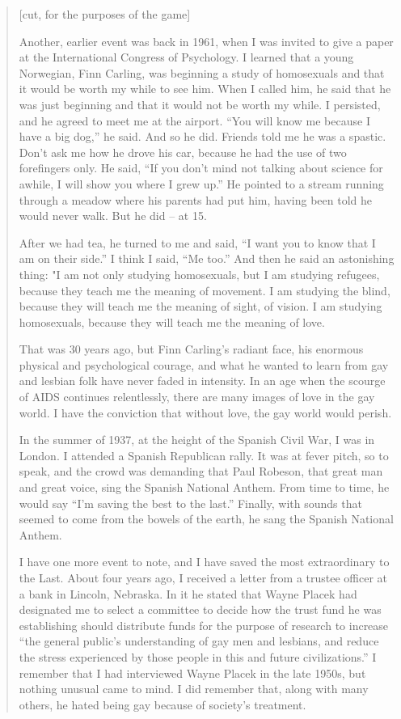 \begin{refsection}
\begin{quote}
[cut, for the purposes of the game]

Another, earlier event was back in 1961, when I was invited to give a paper at the International Congress of Psychology. I learned that a young Norwegian, Finn Carling, was beginning a study of homosexuals and that it would be worth my while to see him. When I called him, he said that he was just beginning and that it would not be worth my while. I persisted, and he agreed to meet me at the airport. ``You will know me because I have a big dog,'' he said. And so he did. Friends told me he was a spastic. Don't ask me how he drove his car, because he had the use of two forefingers only. He said, ``If you don't mind not talking about science for awhile, I will show you where I grew up.'' He pointed to a stream running through a meadow where his parents had put him, having been told he would never walk. But he did – at 15.

After we had tea, he turned to me and said, ``I want you to know that I am on their side.'' I think I said, ``Me too.'' And then he said an astonishing thing: "I am not only studying homosexuals, but I am studying refugees, because they teach me the meaning of movement. I am studying the blind, because they will teach me the meaning of sight, of vision. I am studying homosexuals, because they will teach me the meaning of love.

That was 30 years ago, but Finn Carling's radiant face, his enormous physical and psychological courage, and what he wanted to learn from gay and lesbian folk have never faded in intensity. In an age when the scourge of AIDS continues relentlessly, there are many images of love in the gay world. I have the conviction that without love, the gay world would perish.

In the summer of 1937, at the height of the Spanish Civil War, I was in London. I attended a Spanish Republican rally. It was at fever pitch, so to speak, and the crowd was demanding that Paul Robeson, that great man and great voice, sing the Spanish National Anthem. From time to time, he would say ``I'm saving the best to the last.'' Finally, with sounds that seemed to come from the bowels of the earth, he sang the Spanish National Anthem.

I have one more event to note, and I have saved the most extraordinary to the Last. About four years ago, I received a letter from a trustee officer at a bank in Lincoln, Nebraska. In it he stated that Wayne Placek had designated me to select a committee to decide how the trust fund he was establishing should distribute funds for the purpose of research to increase ``the general public's understanding of gay men and lesbians, and reduce the stress experienced by those people in this and future civilizations.'' I remember that I had interviewed Wayne Placek in the late 1950s, but nothing unusual came to mind. I did remember that, along with many others, he hated being gay because of society's treatment.


\end{quote}
\end{refsection}
